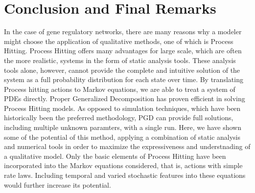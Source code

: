 \documentclass{article}
\begin{document}
\section{Conclusion and Final Remarks}
In the case of gene regulatory networks, there are many reasons why a modeler might choose the application of qualitative methods, one of which is Process Hitting. Process Hitting offers many advantages for large scale, which are often the more realistic, systems in the form of static analysis tools. These analysis tools alone, however, cannot provide the complete and intuitive solution of the system as a full probability distribution for each state over time. By translating Process hitting actions to Markov equations, we are able to treat a system of PDEs directly. Proper Generalized Decomposition has proven efficient in solving Process Hitting models. As opposed to simulation techniques, which have been historically been the preferred methodology, PGD can provide full solutions, including multiple unknown paramters, with a single run. Here, we have shown some of the potential of this method, applying a combination of static analysis and numerical tools in order to maximize the expressiveness and understnading of a qualitative model. Only the basic elements of Process Hitting have been incorporated into the Markov equations considered, that is, actions with simple rate laws. Including temporal and varied stochastic features into these equations would further increase its potential.



\end{document}
